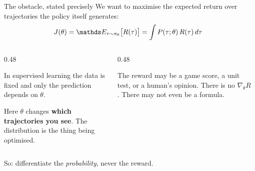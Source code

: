 \documentclass[aspectratio=169]{beamer}
\begin{document}
\begin{frame}{The obstacle, stated precisely}
  \small
  We want to maximise the expected return over trajectories the policy itself generates:
  \[ J(\theta) = \E_{\tau \sim \pi_\theta}\big[ R(\tau) \big] = \int P(\tau;\theta)\, R(\tau)\, d\tau \]

  \vskip 8pt
  \begin{columns}[T]
    \begin{column}{0.48\textwidth}
      \begin{tcolorbox}[colback=armred!8, colframe=armred, boxrule=0.6pt, arc=2pt,
                        title={\textbf{Why the usual move fails}}]
        \small
        In supervised learning the data is fixed and only the prediction depends on $\theta$.

        \vskip 4pt
        Here $\theta$ changes \textbf{which trajectories you see}. The distribution is the thing
        being optimised.
      \end{tcolorbox}
    \end{column}
    \begin{column}{0.48\textwidth}
      \begin{tcolorbox}[colback=armorange!12, colframe=armorange, boxrule=0.6pt, arc=2pt,
                        title={\textbf{And $R(\tau)$ is a black box}}]
        \small
        The reward may be a game score, a unit test, or a human's opinion. There is no
        $\nabla_\theta R$. There may not even be a formula.
      \end{tcolorbox}
    \end{column}
  \end{columns}

  \vskip 8pt
  \begin{center}
    \small
    So: differentiate the \emph{probability}, never the reward.
  \end{center}
\end{frame}
\end{document}
